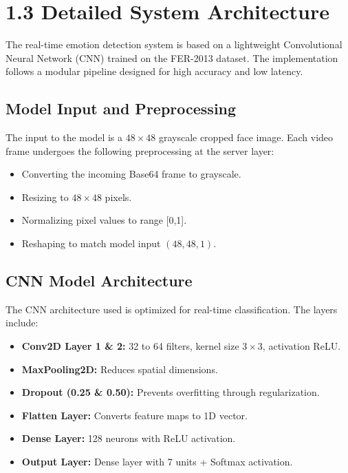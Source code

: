 \documentclass[12pt,a4paper]{report}
\begin{document}
\section*{1.3 Detailed System Architecture}

The real-time emotion detection system is based on a lightweight Convolutional
Neural Network (CNN) trained on the FER-2013 dataset. The implementation follows
a modular pipeline designed for high accuracy and low latency.

\subsection*{Model Input and Preprocessing}
The input to the model is a \(48 \times 48\) grayscale cropped face image. Each video
frame undergoes the following preprocessing at the server layer:
\begin{itemize}
    \item Converting the incoming Base64 frame to grayscale.
    \item Resizing to \(48 \times 48\) pixels.
    \item Normalizing pixel values to range [0,1].
    \item Reshaping to match model input \((48,48,1)\).
\end{itemize}

\subsection*{CNN Model Architecture}
The CNN architecture used is optimized for real-time classification. The layers include:
\begin{itemize}
    \item \textbf{Conv2D Layer 1 \& 2:} 32 to 64 filters, kernel size \(3 \times 3\), activation ReLU.
    \item \textbf{MaxPooling2D:} Reduces spatial dimensions.
    \item \textbf{Dropout (0.25 \& 0.50):} Prevents overfitting through regularization.
    \item \textbf{Flatten Layer:} Converts feature maps to 1D vector.
    \item \textbf{Dense Layer:} 128 neurons with ReLU activation.
    \item \textbf{Output Layer:} Dense layer with 7 units + Softmax activation.
\end{itemize}

\clearpage

\end{document}
